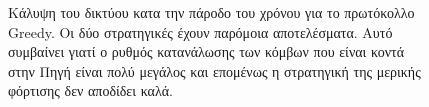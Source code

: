 \begin{figure}[H]
  \centering
  \caption{Κάλυψη του δικτύου κατα την πάροδο του χρόνου για το πρωτόκολλο Greedy. Οι δύο στρατηγικές έχουν παρόμοια αποτελέσματα. Αυτό
συμβαίνει γιατί ο ρυθμός κατανάλωσης των κόμβων που είναι κοντά στην Πηγή είναι πολύ μεγάλος και επομένως η στρατηγική της μερικής φόρτισης δεν αποδίδει καλά.}
  \label{fig:2exp_3_1}
\end{figure}

